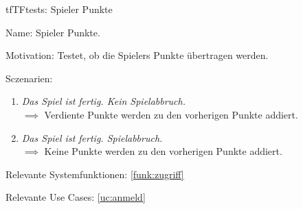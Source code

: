 \begin{description}[leftmargin=5em, style=sameline]

\begin{lhp}{tf}{TF}{tests: Spieler Punkte }
	\item [Name:] Spieler Punkte.
	\item [Motivation:] Testet, ob die Spielers Punkte übertragen werden.
	\item [Sczenarien:] \hfill
		\begin{enumerate}
			\item \textit{Das Spiel ist fertig. Kein Spielabbruch.} \\ $\implies$ Verdiente Punkte werden zu den vorherigen Punkte addiert.
			\item \textit{Das Spiel ist fertig. Spielabbruch.} \\ $\implies$ Keine Punkte werden zu den vorherigen Punkte addiert.
		\end{enumerate}
	\item [Relevante Systemfunktionen:] \ref{funk:zugriff}
	\item [Relevante Use Cases:] \ref{uc:anmeld}
\end{lhp}

\end{description}






























